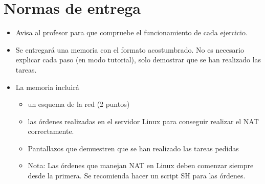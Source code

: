 \section{Normas de entrega}
\begin{itemize}
\item Avisa al profesor para que compruebe el funcionamiento de cada ejercicio. 
\item Se entregará una memoria con el formato acostumbrado. No es necesario explicar cada paso (en modo tutorial), solo demostrar que se han realizado las tareas.
\item La memoria incluirá

  \begin{itemize}
  \item un esquema de la red (2 puntos)
  \item las órdenes realizadas en el servidor Linux para conseguir realizar el NAT correctamente.
  \item Pantallazos que demuestren que se han realizado las tareas pedidas
  \item
    \begin{small}
Nota: Las órdenes que manejan NAT en Linux deben comenzar siempre desde la primera. Se recomienda hacer un script SH para las órdenes.
\end{small}

  \end{itemize}

\end{itemize}

